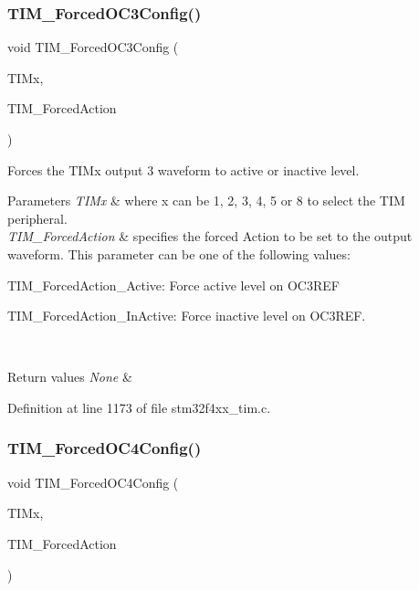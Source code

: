 \subsubsection{\texorpdfstring{T\+I\+M\+\_\+\+Forced\+O\+C3\+Config()}{TIM\_ForcedOC3Config()}}
{\footnotesize\ttfamily void T\+I\+M\+\_\+\+Forced\+O\+C3\+Config (\begin{DoxyParamCaption}\item[{\hyperlink{struct_t_i_m___type_def}{T\+I\+M\+\_\+\+Type\+Def} $\ast$}]{T\+I\+Mx,  }\item[{uint16\+\_\+t}]{T\+I\+M\+\_\+\+Forced\+Action }\end{DoxyParamCaption})}



Forces the T\+I\+Mx output 3 waveform to active or inactive level. 


\begin{DoxyParams}{Parameters}
{\em T\+I\+Mx} & where x can be 1, 2, 3, 4, 5 or 8 to select the T\+IM peripheral. \\
\hline
{\em T\+I\+M\+\_\+\+Forced\+Action} & specifies the forced Action to be set to the output waveform. This parameter can be one of the following values\+: \begin{DoxyItemize}
\item T\+I\+M\+\_\+\+Forced\+Action\+\_\+\+Active\+: Force active level on O\+C3\+R\+EF \item T\+I\+M\+\_\+\+Forced\+Action\+\_\+\+In\+Active\+: Force inactive level on O\+C3\+R\+EF. \end{DoxyItemize}
\\
\hline
\end{DoxyParams}

\begin{DoxyRetVals}{Return values}
{\em None} & \\
\hline
\end{DoxyRetVals}


Definition at line 1173 of file stm32f4xx\+\_\+tim.\+c.

\mbox{\label{group___t_i_m_gaf0a0bbe74251e56d4b835d20b0a3aa63}} 
\subsubsection{\texorpdfstring{T\+I\+M\+\_\+\+Forced\+O\+C4\+Config()}{TIM\_ForcedOC4Config()}}
{\footnotesize\ttfamily void T\+I\+M\+\_\+\+Forced\+O\+C4\+Config (\begin{DoxyParamCaption}\item[{\hyperlink{struct_t_i_m___type_def}{T\+I\+M\+\_\+\+Type\+Def} $\ast$}]{T\+I\+Mx,  }\item[{uint16\+\_\+t}]{T\+I\+M\+\_\+\+Forced\+Action }\end{DoxyParamCaption})}



